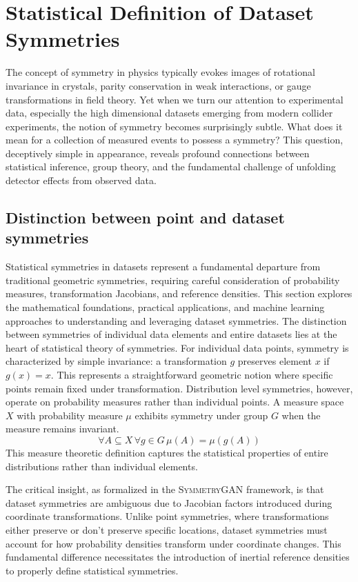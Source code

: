 \section{Statistical Definition of Dataset Symmetries}
    \label{sec:statistical-def-of-symmetries}
    The concept of symmetry in physics typically evokes images of rotational invariance in crystals, parity conservation in weak interactions, or gauge transformations in field theory.
    Yet when we turn our attention to experimental data, especially the high dimensional datasets emerging from modern collider experiments, the notion of symmetry becomes surprisingly subtle.
    What does it mean for a collection of measured events to possess a symmetry?
    This question, deceptively simple in appearance, reveals profound connections between statistical inference, group theory, and the fundamental challenge of unfolding detector effects from observed data.
    \subsection{Distinction between point and dataset symmetries}
        Statistical symmetries in datasets represent a fundamental departure from traditional geometric symmetries, requiring careful consideration of probability measures, transformation Jacobians, and reference densities.
        This section explores the mathematical foundations, practical applications, and machine learning approaches to understanding and leveraging dataset symmetries.
        The distinction between symmetries of individual data elements and entire datasets lies at the heart of statistical theory of symmetries.
        For individual data points, symmetry is characterized by simple invariance: a transformation \(g\) preserves element \(x\) if \(g(x) = x\). This represents a straightforward geometric notion where specific points remain fixed under transformation.
        Distribution level symmetries, however, operate on probability measures rather than individual points.
        A measure space \(X\) with probability measure \(\mu\) exhibits symmetry under group \(G\) when the measure remains invariant.\kd{}
        \[
            \forall A\subseteq X \, \forall g\in G\, \mu(A) = \mu(g(A))
        \]
        This measure theoretic definition captures the statistical properties of entire distributions rather than individual elements.
        
        The critical insight, as formalized in the \textsc{SymmetryGAN} framework, is that dataset symmetries are ambiguous due to Jacobian factors introduced during coordinate transformations.\kd{}
        Unlike point symmetries, where transformations either preserve or don't preserve specific locations, dataset symmetries must account for how probability densities transform under coordinate changes.
        This fundamental difference necessitates the introduction of inertial reference densities to properly define statistical symmetries.
